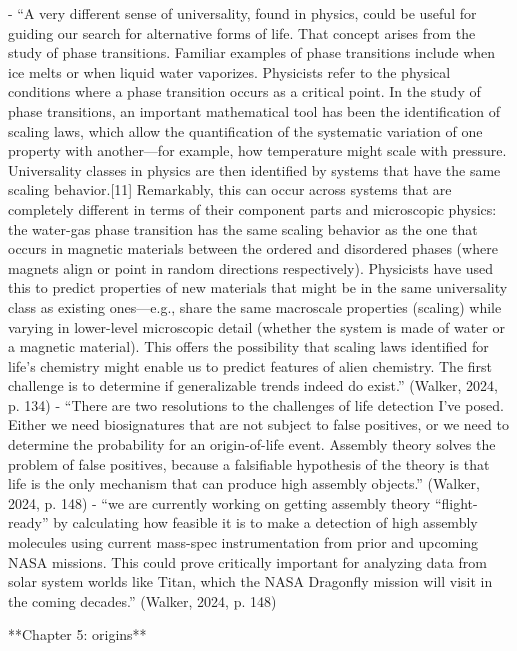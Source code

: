 \documentclass[11pt]{article}
\begin{document}
\begin{markdown}
- “A very different sense of universality, found in physics, could be useful for guiding our search for alternative forms of life. That concept arises from the study of phase transitions. Familiar examples of phase transitions include when ice melts or when liquid water vaporizes. Physicists refer to the physical conditions where a phase transition occurs as a critical point. In the study of phase transitions, an important mathematical tool has been the identification of scaling laws, which allow the quantification of the systematic variation of one property with another—for example, how temperature might scale with pressure. Universality classes in physics are then identified by systems that have the same scaling behavior.[11] Remarkably, this can occur across systems that are completely different in terms of their component parts and microscopic physics: the water-gas phase transition has the same scaling behavior as the one that occurs in magnetic materials between the ordered and disordered phases (where magnets align or point in random directions respectively). Physicists have used this to predict properties of new materials that might be in the same universality class as existing ones—e.g., share the same macroscale properties (scaling) while varying in lower-level microscopic detail (whether the system is made of water or a magnetic material). This offers the possibility that scaling laws identified for life’s chemistry might enable us to predict features of alien chemistry. The first challenge is to determine if generalizable trends indeed do exist.” (Walker, 2024, p. 134)
- “There are two resolutions to the challenges of life detection I’ve posed. Either we need biosignatures that are not subject to false positives, or we need to determine the probability for an origin-of-life event. Assembly theory solves the problem of false positives, because a falsifiable hypothesis of the theory is that life is the only mechanism that can produce high assembly objects.” (Walker, 2024, p. 148)
- “we are currently working on getting assembly theory “flight-ready” by calculating how feasible it is to make a detection of high assembly molecules using current mass-spec instrumentation from prior and upcoming NASA missions. This could prove critically important for analyzing data from solar system worlds like Titan, which the NASA Dragonfly mission will visit in the coming decades.” (Walker, 2024, p. 148)

**Chapter 5: origins**


\end{markdown}
\end{document}
